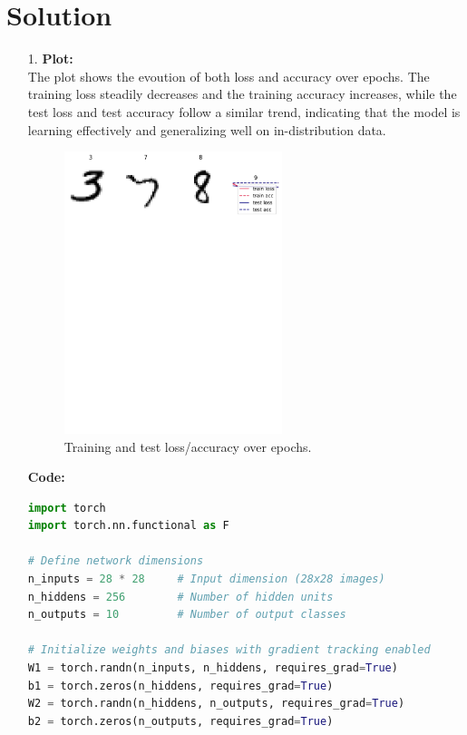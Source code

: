 \documentclass[submit]{../harvardml}
\newenvironment{answer}
  {\section*{Solution}}
{}
\begin{document}
\begin{answer}

  \begin{enumerate}
    \item[1.]
      \textbf{Plot:} \\
      The   plot shows the evoution of both loss and accuracy over epochs. The training loss steadily decreases and the training accuracy increases, while the test loss and test accuracy follow a similar trend, indicating that the model is learning effectively and generalizing well on in-distribution data.

      \begin{figure}[h]
        \centering
        \includegraphics[width=0.6\textwidth]{data/training_graph.pdf}
        \caption{Training and test loss/accuracy over epochs.}
        \label{fig:training}
      \end{figure}

      \vspace{0.5em}
      \textbf{Code:}
      \begin{lstlisting}[language=Python]
import torch
import torch.nn.functional as F

# Define network dimensions
n_inputs = 28 * 28     # Input dimension (28x28 images)
n_hiddens = 256        # Number of hidden units
n_outputs = 10         # Number of output classes

# Initialize weights and biases with gradient tracking enabled
W1 = torch.randn(n_inputs, n_hiddens, requires_grad=True)
b1 = torch.zeros(n_hiddens, requires_grad=True)
W2 = torch.randn(n_hiddens, n_outputs, requires_grad=True)
b2 = torch.zeros(n_outputs, requires_grad=True)


\end{lstlisting}
\end{enumerate}
\end{answer}
\end{document}
